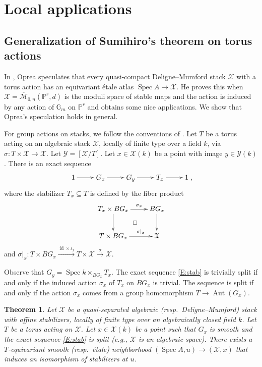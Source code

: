 \documentclass[a4paper]{amsart}
\theoremstyle{plain}
\newtheorem{theorem}{Theorem}[section]
\theoremstyle{definition}
\theoremstyle{remark}
\numberwithin{equation}{section}
\newcommand{\GG}{\mathbb{G}}
\newcommand{\PP}{\mathbb{P}}
\newcommand\cM{\mathcal{M}}
\newcommand\cX{\mathcal{X}}
\newcommand\cY{\mathcal{Y}}
\newcommand\co{\colon}
\DeclareMathOperator{\Spec}{Spec}
\DeclareMathOperator{\id}{id}
\DeclareMathOperator{\Aut}{Aut}
\begin{document}
\section{Local applications} \label{S:local_applications}
\subsection{Generalization of Sumihiro's theorem on torus actions} \label{A:sumihiro}
In \cite[\S 2]{oprea}, Oprea speculates that every quasi-compact
Deligne--Mumford stack $\cX$ with a torus action has an equivariant \'etale
atlas $\Spec A \to \cX$. He proves this when
$\cX=\overline{\cM}_{0,n}(\PP^r,d)$ is the moduli space of stable maps and the action is induced by any
action of $\GG_m$ on $\PP^r$ and obtains some nice applications. We show that Oprea's speculation holds in general.

For group actions on stacks, we follow the conventions of \cite{romagny}.  
Let $T$ be a torus acting on an algebraic stack $\cX$, locally of finite type over a field $k$, via $\sigma \co T \times \cX \to \cX$.
 Let $\cY = [\cX /T]$.  Let $x \in \cX(k)$ be a point with image $y \in \cY(k)$.  There is an exact sequence
\begin{equation} \label{E:stab}
\xymatrix{1 \ar[r] & G_x \ar[r] &  G_y \ar[r] &  T_x \ar[r] & 1},
\end{equation}
where the stabilizer $T_x \subseteq T$ is defined by the fiber product
\begin{equation} \label{D:stab}
\begin{split} 
\xymatrix{
T_x\times B G_x \ar[r]^-{\sigma_x} \ar[d]				& B G_x \ar[d] \\
T\times B G_x \ar[r]^-{\sigma|_x}	\ar@{}[ur]|\square		& \cX
} \end{split}
\end{equation}
and $\sigma|_x \co T\times B G_x \xrightarrow{\id\times\iota_x} T \times \cX \xrightarrow{\sigma} \cX$.  



 Observe that $G_y= \Spec k \times_{BG_x} T_x$.  The exact sequence \eqref{E:stab} is trivially split if and only if the induced action $\sigma_x$ of $T_x$ on $BG_x$ is trivial. The sequence is split if and only if the action $\sigma_x$ comes from a group homomorphism $T \to \Aut(G_x)$.
\begin{theorem} \label{T:sumi1}
Let $\cX$ be a quasi-separated algebraic (resp.\ Deligne--Mumford) stack with affine stabilizers, locally of finite type over an algebraically closed field $k$.  Let $T$ be a torus acting on $\cX$.  Let $x \in \cX(k)$ be a point such that $G_x$ is smooth and the exact sequence \eqref{E:stab} is split (e.g., $\cX$ is an algebraic space). There exists a $T$-equivariant smooth (resp.\ \'etale) neighborhood $(\Spec A,u) \to (\cX,x)$ that induces an isomorphism of stabilizers at $u$. 
\end{theorem}
\end{document}
